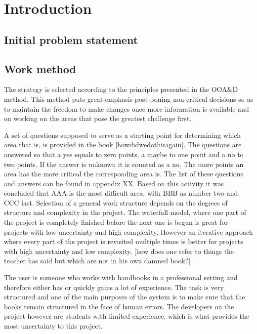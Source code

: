 \chapter{Introduction}
\section{Initial problem statement}
\section{Work method}
The strategy is selected according to the principles presented in the OOA\&D method. This method puts great emphasis post-poning non-critical decisions so as to maintain the freedom to make changes once more information is available and on working on the areas that pose the greatest challenge first. %

A set of questions supposed to serve as a starting point for determining which area that is, is provided in the book [howdidwedothisagain]. The questions are answered so that a yes equals to zero points, a maybe to one point and a no to two points. If the answer is unknown it is counted as a no. The more points an area has the more critical the corresponding area is. The list of these questions and answers can be found in appendix XX.
Based on this activity it was concluded that AAA is the most difficult area, with BBB as number two and CCC last.
Selection of a general work structure depends on the degrees of structure and complexity in the project. The waterfall model, where one part of the project is completely finished before the next one is begun is great for projects with low uncertainty and high complexity. However an iterative approach where every part of the project is revisited  multiple times is better for projects with high uncertainty and low complexity. [how does one refer to things the teacher has said but which are not in his own damned book?] %

The user is someone who works with handbooks in a professional setting and therefore either has or quickly gains a lot of experience. The task is very structured and one of the main purposes of the system is to make sure that the books remain structured in the face of human errors. The developers on the project however are students with limited experience, which is what provides the most uncertainty to this project. %


